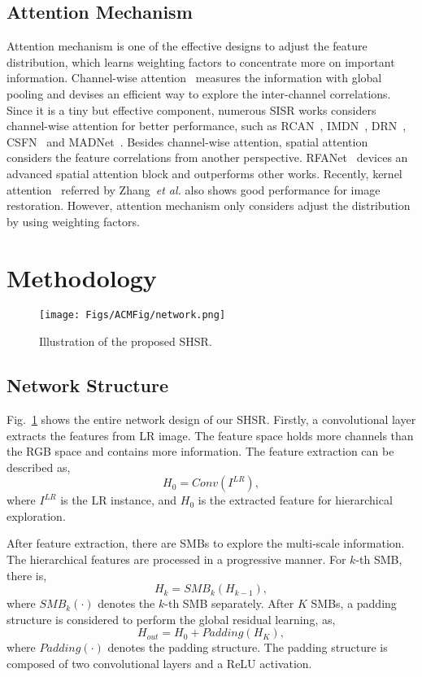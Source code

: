 \documentclass[manuscript,screen]{acmart}
\begin{document}
\subsection{Attention Mechanism}
Attention mechanism is one of the effective designs to adjust the feature distribution, which learns weighting factors to concentrate more on important information. Channel-wise attention~\cite{senet_pami2020} measures the information with global pooling and devises an efficient way to explore the inter-channel correlations. Since it is a tiny but effective component, numerous SISR works considers channel-wise attention for better performance, such as RCAN~\cite{rcan_eccv2018}, IMDN~\cite{imdn_mm2019}, DRN~\cite{drn_cvpr2020}, CSFN~\cite{csfm_csvt2020} and MADNet~\cite{madnet_tcyb2020}. Besides channel-wise attention, spatial attention considers the feature correlations from another perspective. RFANet~\cite{rfanet_cvpr2020} devices an advanced spatial attention block and outperforms other works. Recently, kernel attention~\cite{kam_tomm2020} referred by Zhang~\textit{et al.} also shows good performance for image restoration. However, attention mechanism only considers adjust the distribution by using weighting factors.

\section{Methodology}

\begin{figure}[t]
	\centering
	\texttt{[image: Figs/ACMFig/network.png]}
	\caption{Illustration of the proposed SHSR.}
	\label{fig:network}
\end{figure}

\subsection{Network Structure}
Fig.~\ref{fig:network} shows the entire network design of our SHSR. Firstly, a convolutional layer extracts the features from LR image. The feature space holds more channels than the RGB space and contains more information. The feature extraction can be described as,
\begin{equation}
	H_0 = Conv(I^{LR}),
\end{equation}
where $I^{LR}$ is the LR instance, and $H_0$ is the extracted feature for hierarchical exploration.

After feature extraction, there are SMBs to explore the multi-scale information. The hierarchical features are processed in a progressive manner. For $k$-th SMB, there is,
\begin{equation}
	H_k = SMB_k(H_{k-1}),
\end{equation}
where $SMB_k(\cdot)$ denotes the $k$-th SMB separately. After $K$ SMBs, a padding structure is considered to perform the global residual learning, as,
\begin{equation}
	H_{out} = H_0 + Padding(H_K),
\end{equation}
where $Padding(\cdot)$ denotes the padding structure. The padding structure is composed of two convolutional layers and a ReLU activation. 
\end{document}
